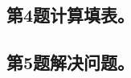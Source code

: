 \subsection*{第4题\quad 计算填表。}
\subsection*{第5题\quad 解决问题。}
\par\noindent\makebox[\linewidth][c]{}\par
